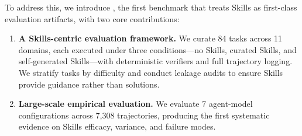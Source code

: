 To address this, we introduce \benchmarkName{}, the first benchmark that treats Skills as first-class evaluation artifacts, with two core contributions:
\begin{enumerate}[nosep,leftmargin=*]
\item \textbf{A Skills-centric evaluation framework.} We curate 84 tasks across 11 domains, each executed under three conditions---no Skills, curated Skills, and self-generated Skills---with deterministic verifiers and full trajectory logging. We stratify tasks by difficulty and conduct leakage audits to ensure Skills provide guidance rather than solutions.

\item \textbf{Large-scale empirical evaluation.} We evaluate 7 agent-model configurations across 7,308 trajectories, producing the first systematic evidence on Skills efficacy, variance, and failure modes.


\end{enumerate}




